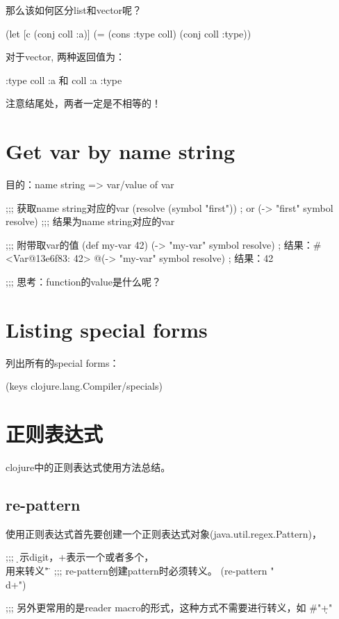﻿\documentclass[a4paper,11pt]{article}
\begin{document}
  那么该如何区分list和vector呢？
  
  \begin{schemecode}
(let [c (conj coll :a)]
  (= (cons :type coll) (conj coll :type))
  \end{schemecode}

  对于vector, 两种返回值为：\par
  :type coll :a 和 coll :a :type

  注意结尾处，两者一定是不相等的！


  \section[Get var by name string]{Get var by name string}
  目的：name string => var/value of var

  \begin{schemecode}
;;; 获取name string对应的var
(resolve (symbol "first"))
; or
(-> "first" symbol resolve)
;;; 结果为name string对应的var

;;; 附带取var的值
(def my-var 42)
(-> "my-var" symbol resolve)
; 结果：#<Var@13e6f83: 42>
@(-> "my-var" symbol resolve)
; 结果：42

;;; 思考：function的value是什么呢？
  \end{schemecode}


  \section[Listing special forms]{Listing special forms}
  列出所有的special forms：

  \begin{schemecode}
(keys clojure.lang.Compiler/specials)
  \end{schemecode}


  \section[正则表达式]{正则表达式}
  clojure中的正则表达式使用方法总结。

  \subsection[re-pattern]{re-pattern}
  使用正则表达式首先要创建一个正则表达式对象(java.util.regex.Pattern)，

  \begin{schemecode}
;;; \d 表示digit，+表示一个或者多个，\\用来转义"\"，
;;; re-pattern创建pattern时必须转义。
(re-pattern "\\d+")

;;; 另外更常用的是reader macro的形式，这种方式不需要进行转义，如
#"\d+"
  \end{schemecode}
\end{document}
